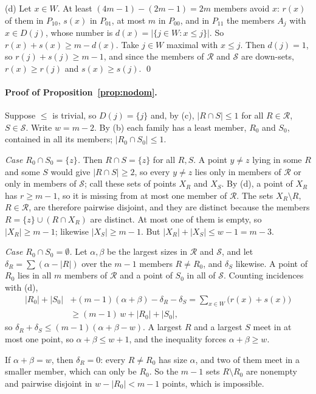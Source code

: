 \documentclass[12pt]{article}
\theoremstyle{plain}
\begin{document}
(d) Let $x\in W$. At least $(4m-1)-(2m-1)=2m$ members avoid $x$: $r(x)$ of them in $P_{10}$, $s(x)$ in $P_{01}$, at most $m$ in $P_{00}$, and in $P_{11}$ the members $A_j$ with $x\in D(j)$, whose number is $d(x)=|\{j\in W:x\le j\}|$. So $r(x)+s(x)\ge m-d(x)$. Take $j\in W$ maximal with $x\le j$. Then $d(j)=1$, so $r(j)+s(j)\ge m-1$, and since the members of $\mathcal R$ and $\mathcal S$ are down-sets, $r(x)\ge r(j)$ and $s(x)\ge s(j)$. \qed

\paragraph*{Proof of Proposition~\ref{prop:nodom}.} Suppose $\le$ is trivial, so $D(j)=\{j\}$ and, by (c), $|R\cap S|\le1$ for all $R\in\mathcal R$, $S\in\mathcal S$. Write $w=m-2$. By (b) each family has a least member, $R_0$ and $S_0$, contained in all its members; $|R_0\cap S_0|\le 1$.

\emph{Case $R_0\cap S_0=\{z\}$.} Then $R\cap S=\{z\}$ for all $R,S$. A point $y\ne z$ lying in some $R$ and some $S$ would give $|R\cap S|\ge2$, so every $y\neq z$ lies only in members of $\mathcal R$ or only in members of $\mathcal S$; call these sets of points $X_R$ and $X_S$. By (d), a point of $X_R$ has $r\ge m-1$, so it is missing from at most one member of $\mathcal R$. The sets $X_R\setminus R$, $R\in\mathcal R$, are therefore pairwise disjoint, and they are distinct because the members $R=\{z\}\cup(R\cap X_R)$ are distinct. At most one of them is empty, so $|X_R|\ge m-1$; likewise $|X_S|\ge m-1$. But $|X_R|+|X_S|\le w-1=m-3$.

\emph{Case $R_0\cap S_0=\emptyset$.} Let $\alpha,\beta$ be the largest sizes in $\mathcal R$ and $\mathcal S$, and let $\delta_R=\sum(\alpha-|R|)$ over the $m-1$ members $R\neq R_0$, and $\delta_S$ likewise. A point of $R_0$ lies in all $m$ members of $\mathcal R$ and a point of $S_0$ in all of $\mathcal S$. Counting incidences with (d),
\begin{align*}
|R_0|+|S_0|&+(m-1)(\alpha+\beta)-\delta_R-\delta_S=\sum_{x\in W}\bigl(r(x)+s(x)\bigr)\\
&\ge (m-1)\,w+|R_0|+|S_0|,
\end{align*}
so $\delta_R+\delta_S\le(m-1)(\alpha+\beta-w)$. A largest $R$ and a largest $S$ meet in at most one point, so $\alpha+\beta\le w+1$, and the inequality forces $\alpha+\beta\ge w$.

If $\alpha+\beta=w$, then $\delta_R=0$: every $R\neq R_0$ has size $\alpha$, and two of them meet in a smaller member, which can only be $R_0$. So the $m-1$ sets $R\setminus R_0$ are nonempty and pairwise disjoint in $w-|R_0|<m-1$ points, which is impossible.
\end{document}
